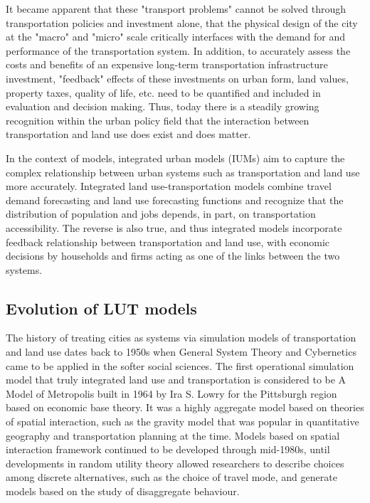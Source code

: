 It became apparent that these "transport problems" cannot be solved through transportation policies and investment alone, that the physical design of the city at the "macro" and "micro" scale critically interfaces with the demand for and performance of the transportation system.
In addition, to accurately assess the costs and benefits of an expensive long-term transportation infrastructure investment, "feedback" effects of these investments on urban form, land values, property taxes, quality of life, etc.
need to be quantified and included in evaluation and decision making.
Thus, today there is a steadily growing recognition within the urban policy field that the interaction between transportation and land use does exist and does matter\cite{Miller2018b}.

In the context of models, integrated urban models (IUMs) aim to capture the complex relationship between urban systems such as transportation and land use more accurately.
Integrated land use-transportation models combine travel demand forecasting and land use forecasting functions and recognize that the distribution of population and jobs depends, in part, on transportation accessibility.
The reverse is also true, and thus integrated models incorporate feedback relationship between transportation and land use, with economic decisions by households and firms acting as one of the links between the two systems\cite{Miller1998}.

\subsection{Evolution of LUT models} \label{subsec:evolution_of_lut_models}

The history of treating cities as systems via simulation models of transportation and land use dates back to 1950s when General System Theory and Cybernetics came to be applied in the softer social sciences\cite{Batty2008}.
The first operational simulation model that truly integrated land use and transportation is considered to be A Model of Metropolis built in 1964 by Ira S. Lowry for the Pittsburgh region based on economic base theory\cite{Lowry1964}.
It was a highly aggregate model based on theories of spatial interaction, such as the gravity model that was popular in quantitative geography and transportation planning at the time\cite{Bouchard1965}.
Models based on spatial interaction framework continued to be developed through mid-1980s, until developments in random utility theory allowed researchers to describe choices among discrete alternatives, such as the choice of travel mode, and generate models based on the study of disaggregate behaviour\cite{Iacono2008}.

